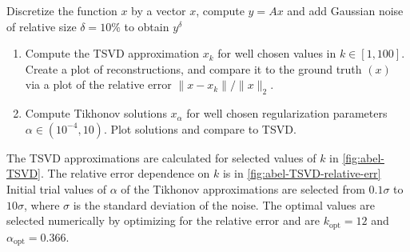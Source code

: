 Discretize the function $x$ by a vector $x$, compute $y = Ax$ and add Gaussian noise of relative size $\delta = 10\%$ to
    obtain $y^\delta$

\begin{enumerate}[label = (\alph*)]
    \item Compute the TSVD approximation $x_k$ for well chosen values in $k \in [1, 100]$. Create a plot of
        reconstructions, and compare it to the ground truth $(x)$ via a plot of the relative error $\|x
        - x_k\|/\|x\|_2$.
    \item Compute Tikhonov solutions $x_\alpha$ for well chosen regularization parameters $\alpha \in (10^{-4}, 10)$.
        Plot solutions and compare to TSVD.
\end{enumerate}

\nopagebreak
\noindent\hrulefill

The TSVD approximations are calculated for selected values of \(k\) in \cref{fig:abel-TSVD}. 
The relative error dependence on \(k\) is in \cref{fig:abel-TSVD-relative-err}
Initial trial values of \(\alpha\) of the Tikhonov approximations are selected from \(0.1\sigma\) to \(10\sigma\), where
    \(\sigma\) is the standard deviation of the noise.
The optimal values are selected numerically by optimizing for the relative error and are \(k_{\text{opt}} = 12\) and
    \(\alpha_{\text{opt}} = 0.366\).


